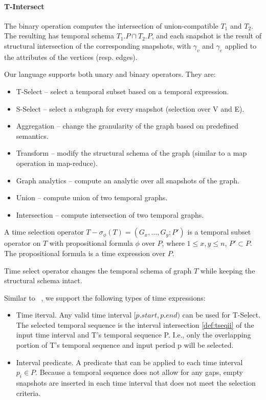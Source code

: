 \paragraph*{T-Intersect} The binary operation  
computes the intersection of union-compatible \tgs $T_1$ and $T_2$.
The resulting \tg has temporal schema $T_1.P \cap T_2.P$, and each
snapshot is the result of structural intersection of the corresponding
snapshots, with $\gamma_v$ and $\gamma_e$ applied to the attributes of
the vertices (resp. edges).

Our language supports both unary and binary operators. They are:
\begin{itemize}
\item T-Select -- select a temporal subset based on a temporal expression.
\item S-Select -- select a subgraph for every snapshot (selection over V and E).
\item Aggregation -- change the granularity of the graph based on predefined semantics.
\item Transform -- modify the structural schema of the graph (similar to a map operation in map-reduce).
\item Graph analytics -- compute an analytic over all snapshots of the graph.
\item Union -- compute union of two temporal graphs.
\item Intersection -- compute intersection of two temporal graphs.
\end{itemize}

\begin{definition} [T-Select]
\label{def:tsel}
A time selection operator $T-\sigma_\phi(T) = (G_x, \ldots, G_y; P')$ is
a temporal subset operator on $T$ with propositional formula $\phi$
over $P$, where $1 \leq x,y \leq n$, $P' \subset P$.  The
propositional formula is a time expression over $P$.
\end{definition}

Time select operator changes the temporal schema of graph $T$ while
keeping the structural schema intact.

Similar to ~\cite{Khurana2013}, we support the following types of time expressions:

\begin{itemize}

\item Time iterval.  Any valid time interval $[p.start,p.end)$ can be
  used for T-Select.  The selected temporal sequence is the interval
  intersection \ref{def:tseqii} of the input time interval and T's
  temporal sequence P.  I.e., only the overlapping portion of T's
  temporal sequence and input period p will be selected.

\item Interval predicate.  A predicate that can be applied to each
  time interval $p_i \in P$.  Because a temporal sequence does not
  allow for any gaps, empty snapshots are inserted in each time
  interval that does not meet the selection criteria.  

\end{itemize}

